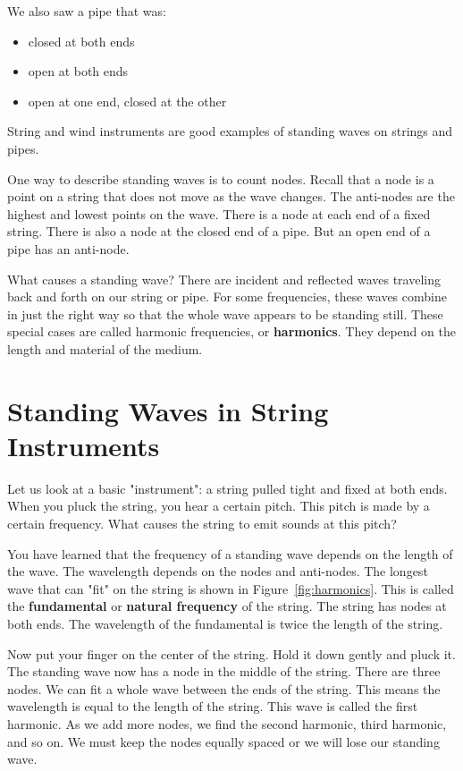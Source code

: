 We also saw a pipe that was:
\begin{itemize}
\item{closed at both ends}
\item{open at both ends}
\item{open at one end, closed at the other}
\end{itemize}

String and wind instruments are good examples of standing waves on strings and pipes.

One way to describe standing waves is to count nodes. 
Recall that a node is a point on a string that does not move as the wave changes. 
The anti-nodes are the highest and lowest points on the wave. There is a node at each end of a fixed string. 
There is also a node at the closed end of a pipe. 
But an open end of a pipe has an anti-node.

What causes a standing wave? There are incident and reflected waves traveling back and forth on our string or pipe. 
For some frequencies, these waves combine in just the right way so that the whole wave appears to be standing still. 
These special cases are called harmonic frequencies, or \textbf{harmonics}. 
They depend on the length and material of the medium.


\section{Standing Waves in String Instruments}
Let us look at a basic "instrument": a string pulled tight and fixed at both ends. 
When you pluck the string, you hear a certain pitch. This pitch is made by a certain frequency. 
What causes the string to emit sounds at this pitch?

You have learned that the frequency of a standing wave depends on the length of the wave. 
The wavelength depends on the nodes and anti-nodes.  
The longest wave that can "fit" on the string is shown in Figure~\ref{fig:harmonics}. 
This is called the \textbf{fundamental} or \textbf{natural frequency} of the string. 
The string has nodes at both ends. The wavelength of the fundamental is twice the length of the string.

Now put your finger on the center of the string.  Hold it down gently and pluck it. 
The standing wave now has a node in the middle of the string.  There are three nodes. 
We can fit a whole wave between the ends of the string. 
This means the wavelength is equal to the length of the string.  
This wave is called the first harmonic.  
As we add more nodes, we find the second harmonic, third harmonic, and so on.  
We must keep the nodes equally spaced or we will lose our standing wave.


